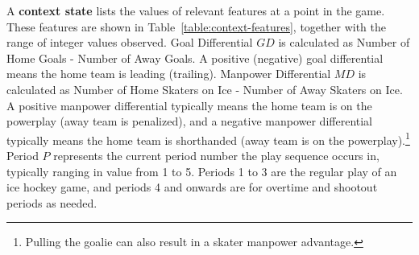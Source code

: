 \documentclass[]{article}
\begin{document}
A \textbf{context state} lists the values of relevant features at a point in the game. These features are shown in Table~\ref{table:context-features}, together with the range of integer values observed.
Goal Differential $GD$ is calculated as Number of Home Goals - Number of Away Goals. A positive (negative) goal differential means the home team is leading (trailing).  Manpower Differential $MD$ is calculated as Number of Home Skaters on Ice - Number of Away Skaters on Ice. A positive manpower differential typically means the home team is on the powerplay (away team is penalized), and a negative manpower differential typically means the home team is shorthanded (away team is on the powerplay).\footnote{Pulling the goalie can also result in a skater manpower advantage.} Period $P$ represents the current period number the play sequence occurs in, typically ranging in value from 1 to 5. Periods 1 to 3 are the regular play of an ice hockey game, and periods 4 and onwards are for overtime and shootout periods as needed.


\end{document}
